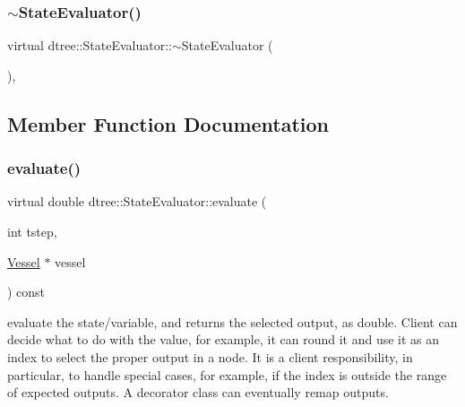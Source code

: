 \mbox{\label{classdtree_1_1_state_evaluator_ad64f28b5b6456b2e1ca1c9021e39b5d4}} 
\subsubsection{\texorpdfstring{$\sim$StateEvaluator()}{~StateEvaluator()}}
{\footnotesize\ttfamily virtual dtree\+::\+State\+Evaluator\+::$\sim$\+State\+Evaluator (\begin{DoxyParamCaption}{ }\end{DoxyParamCaption})\hspace{0.3cm}{\ttfamily [inline]}, {\ttfamily [virtual]}}



\subsection{Member Function Documentation}
\mbox{\label{classdtree_1_1_state_evaluator_ab57666219fbdc728f40d9d5acd5726cb}} 
\subsubsection{\texorpdfstring{evaluate()}{evaluate()}}
{\footnotesize\ttfamily virtual double dtree\+::\+State\+Evaluator\+::evaluate (\begin{DoxyParamCaption}\item[{int}]{tstep,  }\item[{\mbox{\hyperlink{class_vessel}{Vessel}} $\ast$}]{vessel }\end{DoxyParamCaption}) const\hspace{0.3cm}{\ttfamily [pure virtual]}}



evaluate the state/variable, and returns the selected output, as double. Client can decide what to do with the value, for example, it can round it and use it as an index to select the proper output in a node. It is a client responsibility, in particular, to handle special cases, for example, if the index is outside the range of expected outputs. A decorator class can eventually remap outputs. 

